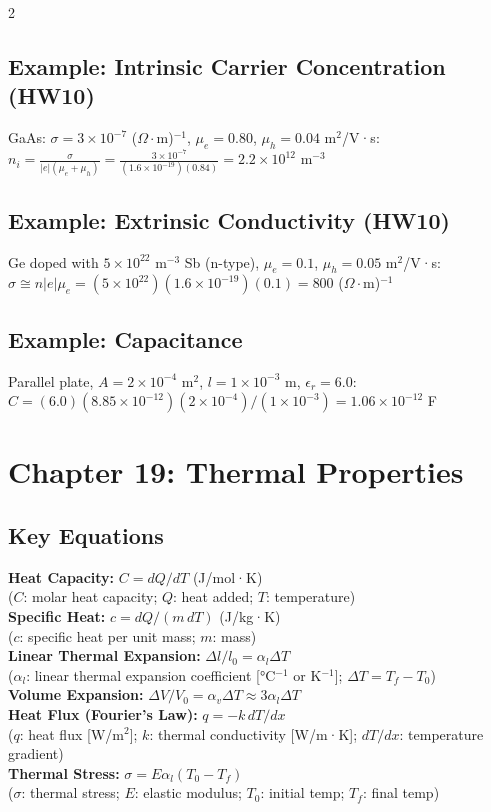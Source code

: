 \documentclass[8pt]{extarticle}
\begin{document}
\begin{multicols*}{2}
\subsection*{Example: Intrinsic Carrier Concentration (HW10)}
GaAs: $\sigma=3\times10^{-7}$ ($\Omega\cdot$m)$^{-1}$, $\mu_e=0.80$, $\mu_h=0.04$ m$^2$/V·s: \\
$n_i = \frac{\sigma}{|e|(\mu_e+\mu_h)} = \frac{3\times10^{-7}}{(1.6\times10^{-19})(0.84)} = 2.2\times10^{12}$ m$^{-3}$
\subsection*{Example: Extrinsic Conductivity (HW10)}
Ge doped with $5\times10^{22}$ m$^{-3}$ Sb (n-type), $\mu_e=0.1$, $\mu_h=0.05$ m$^2$/V·s: \\
$\sigma \cong n|e|\mu_e = (5\times10^{22})(1.6\times10^{-19})(0.1) = 800$ ($\Omega\cdot$m)$^{-1}$
\subsection*{Example: Capacitance}
Parallel plate, $A=2\times10^{-4}$ m$^2$, $l=1\times10^{-3}$ m, $\epsilon_r=6.0$: \\
$C = (6.0)(8.85\times10^{-12})(2\times10^{-4})/(1\times10^{-3}) = 1.06\times10^{-12}$ F

\section*{Chapter 19: Thermal Properties}
\subsection*{Key Equations}
\textbf{Heat Capacity:} $C = dQ/dT$ (J/mol·K) \\
($C$: molar heat capacity; $Q$: heat added; $T$: temperature) \\
\textbf{Specific Heat:} $c = dQ/(m\,dT)$ (J/kg·K) \\
($c$: specific heat per unit mass; $m$: mass) \\
\textbf{Linear Thermal Expansion:} $\Delta l/l_0 = \alpha_l \Delta T$ \\
($\alpha_l$: linear thermal expansion coefficient [°C$^{-1}$ or K$^{-1}$]; $\Delta T = T_f - T_0$) \\
\textbf{Volume Expansion:} $\Delta V/V_0 = \alpha_v \Delta T \approx 3\alpha_l\Delta T$ \\
\textbf{Heat Flux (Fourier's Law):} $q = -k\,dT/dx$ \\
($q$: heat flux [W/m$^2$]; $k$: thermal conductivity [W/m·K]; $dT/dx$: temperature gradient) \\
\textbf{Thermal Stress:} $\sigma = E\alpha_l(T_0 - T_f)$ \\
($\sigma$: thermal stress; $E$: elastic modulus; $T_0$: initial temp; $T_f$: final temp)

\end{multicols*}
\end{document}

